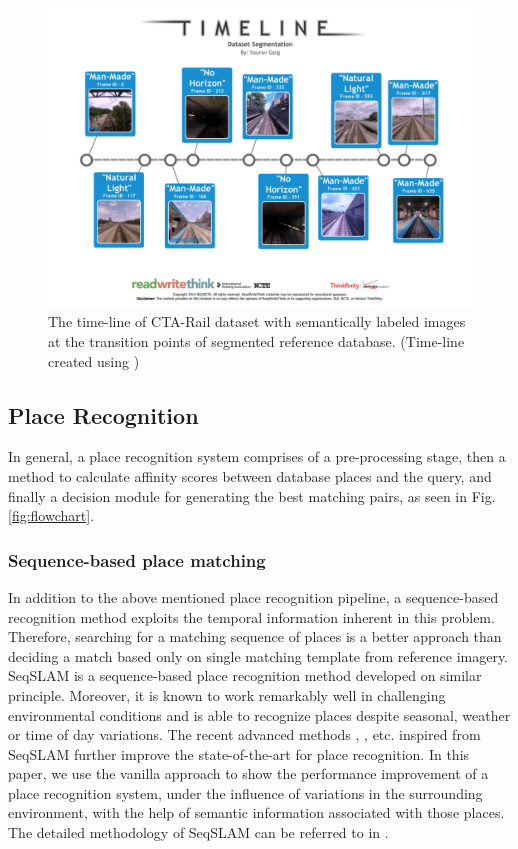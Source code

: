\documentclass[letterpaper, 10 pt, conference]{ieeeconf}  %
\begin{document}
\begin{figure}
 \includegraphics[clip, trim=2cm 4cm 2cm 4cm,scale=0.32]{cta-dataset-segmentation-1}
 \caption{The time-line of CTA-Rail dataset with semantically labeled images at the transition points of segmented reference database. (Time-line created using \cite{timelineRWT})}
 \label{fig:datasetLabels}
\end{figure}

\subsection{Place Recognition}
In general, a place recognition system comprises of a pre-processing stage, then a method to calculate affinity scores between database places and the query, and finally a decision module for generating the best matching pairs, as seen in Fig. \ref{fig:flowchart}.
\subsubsection{Sequence-based place matching}
In addition to the above mentioned place recognition pipeline, a sequence-based recognition method exploits the temporal information inherent in this problem. Therefore, searching for a matching sequence of places is a better approach than deciding a match based only on single matching template from reference imagery. SeqSLAM \cite{Milford2012} is a sequence-based place recognition method developed on similar principle. Moreover, it is known to work remarkably well in challenging environmental conditions and is able to recognize places despite seasonal, weather or time of day variations. The recent advanced methods \cite{milford2015sequence}, \cite{wang2015improved}, \cite{milford2015place} etc. inspired from SeqSLAM further improve the state-of-the-art for place recognition. In this paper, we use the vanilla approach to show the performance improvement of a place recognition system, under the influence of variations in the surrounding environment, with the help of semantic information associated with those places. The detailed methodology of SeqSLAM can be referred to in \cite{Milford2012}.
\end{document}
